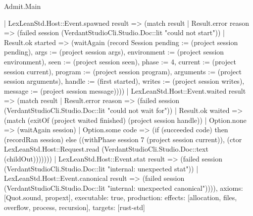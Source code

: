 \begin{lexlean}{Admit.Main}
\begin{semanticmodule}
{    | LexLeanStd.Host::Event.spawned result => (match result
      | Result.error reason => (failed session (VerdantStudioCli.Studio.Doc::lit "could not start"))
      | Result.ok started => (waitAgain (record Session {pending := (project session pending), args := (project session args), environment := (project session environment), seen := (project session seen), phase := 4, current := (project session current), program := (project session program), arguments := (project session arguments), handle := (first started), writes := (project session writes), message := (project session message)})))
    | LexLeanStd.Host::Event.waited result => (match result
      | Result.error reason => (failed session (VerdantStudioCli.Studio.Doc::lit "could not wait for"))
      | Result.ok waited => (match (exitOf (project waited finished) (project session handle))
        | Option.none => (waitAgain session)
        | Option.some code => (if (succeeded code) then (recordRan session) else ((withPhase session 7 (project session current)), (ctor LexLeanStd.Host::Request.read (VerdantStudioCli.Studio.Doc::text (childOut)))))))
    | LexLeanStd.Host::Event.stat result => (failed session (VerdantStudioCli.Studio.Doc::lit "internal: unexpected stat"))
    | LexLeanStd.Host::Event.canonical result => (failed session (VerdantStudioCli.Studio.Doc::lit "internal: unexpected canonical")))),
  axioms: [Quot.sound, propext],
  executable: true,
  production: {effects: [allocation, files, overflow, process, recursion], targets: [rust-std]}
}
\end{semanticmodule}
\end{lexlean}
